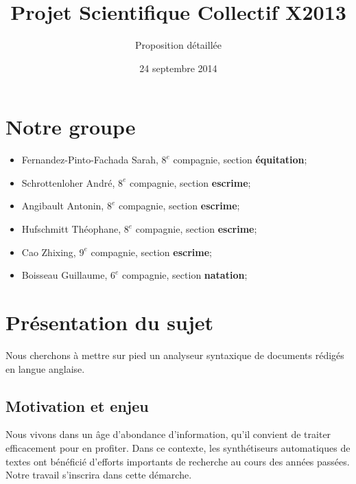 \documentclass{article}           %
\title{Projet Scientifique Collectif X2013}     %
\author{Proposition détaillée}        %
\date{24 septembre 2014}
\begin{document}

\maketitle                        %


\newpage

\tableofcontents			
\newpage

\section*{Notre groupe}

\begin{itemize}
 \item Fernandez-Pinto-Fachada Sarah, \textbf{$8^e$} compagnie, section \textbf{équitation};
 \item Schrottenloher André, \textbf{$8^e$} compagnie, section \textbf{escrime};
 \item Angibault Antonin, \textbf{$8^e$} compagnie, section \textbf{escrime};
 \item Hufschmitt Théophane, \textbf{$8^e$} compagnie, section \textbf{escrime};
 \item Cao Zhixing, \textbf{$9^e$} compagnie, section \textbf{escrime};
 \item Boisseau Guillaume, \textbf{$6^e$} compagnie, section \textbf{natation};
\end{itemize}


\section{Présentation du sujet} %

Nous cherchons à mettre sur pied un analyseur syntaxique de documents rédigés en langue anglaise.

\subsection{Motivation et enjeu}
Nous vivons dans un \^{a}ge d'abondance d'information, qu'il convient de traiter efficacement pour en profiter. Dans ce contexte, les synthétiseurs automatiques de textes ont bénéficié d'efforts importants de recherche au cours des années passées. Notre travail s'inscrira dans cette démarche.\cite{elhadad_natural_2010}\\
\end{document}
